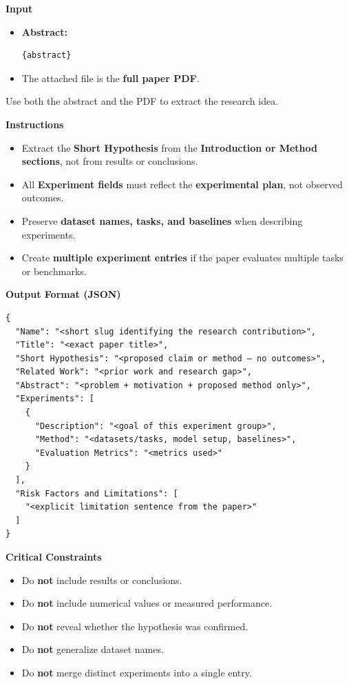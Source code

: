 \begin{tcolorbox}[title=\textbf{User Prompt to Extract Proposal}]
\small

\textbf{Input}
\begin{itemize}
\item \textbf{Abstract:}
\begin{verbatim}
{abstract}
\end{verbatim}
\item The attached file is the \textbf{full paper PDF}.
\end{itemize}

Use both the abstract and the PDF to extract the research idea.

\vspace{0.3em}
\textbf{Instructions}
\begin{itemize}
\item Extract the \textbf{Short Hypothesis} from the \textbf{Introduction or Method sections}, not from results or conclusions.
\item All \textbf{Experiment fields} must reflect the \textbf{experimental plan}, not observed outcomes.
\item Preserve \textbf{dataset names, tasks, and baselines} when describing experiments.
\item Create \textbf{multiple experiment entries} if the paper evaluates multiple tasks or benchmarks.
\end{itemize}

\vspace{0.3em}
\textbf{Output Format (JSON)}
\begin{verbatim}
{
  "Name": "<short slug identifying the research contribution>",
  "Title": "<exact paper title>",
  "Short Hypothesis": "<proposed claim or method — no outcomes>",
  "Related Work": "<prior work and research gap>",
  "Abstract": "<problem + motivation + proposed method only>",
  "Experiments": [
    {
      "Description": "<goal of this experiment group>",
      "Method": "<datasets/tasks, model setup, baselines>",
      "Evaluation Metrics": "<metrics used>"
    }
  ],
  "Risk Factors and Limitations": [
    "<explicit limitation sentence from the paper>"
  ]
}
\end{verbatim}

\vspace{0.3em}
\textbf{Critical Constraints}
\begin{itemize}
\item Do \textbf{not} include results or conclusions.
\item Do \textbf{not} include numerical values or measured performance.
\item Do \textbf{not} reveal whether the hypothesis was confirmed.
\item Do \textbf{not} generalize dataset names.
\item Do \textbf{not} merge distinct experiments into a single entry.
\end{itemize}

\end{tcolorbox}

